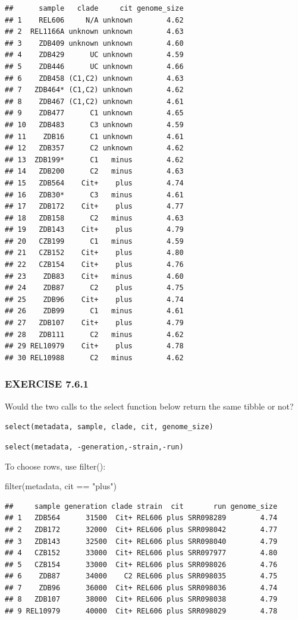 \documentclass[
]{book}
\newenvironment{Shaded}{\begin{snugshade}}{\end{snugshade}}
\newcommand{\FunctionTok}[1]{\textcolor[rgb]{0.00,0.00,0.00}{#1}}
\newcommand{\NormalTok}[1]{#1}
\newcommand{\SpecialCharTok}[1]{\textcolor[rgb]{0.00,0.00,0.00}{#1}}
\newcommand{\StringTok}[1]{\textcolor[rgb]{0.31,0.60,0.02}{#1}}
\begin{document}
\begin{verbatim}
##      sample   clade     cit genome_size
## 1    REL606     N/A unknown        4.62
## 2  REL1166A unknown unknown        4.63
## 3    ZDB409 unknown unknown        4.60
## 4    ZDB429      UC unknown        4.59
## 5    ZDB446      UC unknown        4.66
## 6    ZDB458 (C1,C2) unknown        4.63
## 7   ZDB464* (C1,C2) unknown        4.62
## 8    ZDB467 (C1,C2) unknown        4.61
## 9    ZDB477      C1 unknown        4.65
## 10   ZDB483      C3 unknown        4.59
## 11    ZDB16      C1 unknown        4.61
## 12   ZDB357      C2 unknown        4.62
## 13  ZDB199*      C1   minus        4.62
## 14   ZDB200      C2   minus        4.63
## 15   ZDB564    Cit+    plus        4.74
## 16   ZDB30*      C3   minus        4.61
## 17   ZDB172    Cit+    plus        4.77
## 18   ZDB158      C2   minus        4.63
## 19   ZDB143    Cit+    plus        4.79
## 20   CZB199      C1   minus        4.59
## 21   CZB152    Cit+    plus        4.80
## 22   CZB154    Cit+    plus        4.76
## 23    ZDB83    Cit+   minus        4.60
## 24    ZDB87      C2    plus        4.75
## 25    ZDB96    Cit+    plus        4.74
## 26    ZDB99      C1   minus        4.61
## 27   ZDB107    Cit+    plus        4.79
## 28   ZDB111      C2   minus        4.62
## 29 REL10979    Cit+    plus        4.78
## 30 REL10988      C2   minus        4.62
\end{verbatim}

\hypertarget{exercise-7.6.1}{%
\subsubsection*{EXERCISE 7.6.1}\label{exercise-7.6.1}}

Would the two calls to the select function below return the same tibble or not?

\texttt{select(metadata,\ sample,\ clade,\ cit,\ genome\_size)}

\texttt{select(metadata,\ -generation,-strain,-run)}

To choose rows, use filter():

\begin{Shaded}
\begin{Highlighting}[]
\FunctionTok{filter}\NormalTok{(metadata, cit }\SpecialCharTok{==} \StringTok{"plus"}\NormalTok{)}
\end{Highlighting}
\end{Shaded}

\begin{verbatim}
##     sample generation clade strain  cit       run genome_size
## 1   ZDB564      31500  Cit+ REL606 plus SRR098289        4.74
## 2   ZDB172      32000  Cit+ REL606 plus SRR098042        4.77
## 3   ZDB143      32500  Cit+ REL606 plus SRR098040        4.79
## 4   CZB152      33000  Cit+ REL606 plus SRR097977        4.80
## 5   CZB154      33000  Cit+ REL606 plus SRR098026        4.76
## 6    ZDB87      34000    C2 REL606 plus SRR098035        4.75
## 7    ZDB96      36000  Cit+ REL606 plus SRR098036        4.74
## 8   ZDB107      38000  Cit+ REL606 plus SRR098038        4.79
## 9 REL10979      40000  Cit+ REL606 plus SRR098029        4.78
\end{verbatim}
\end{document}
